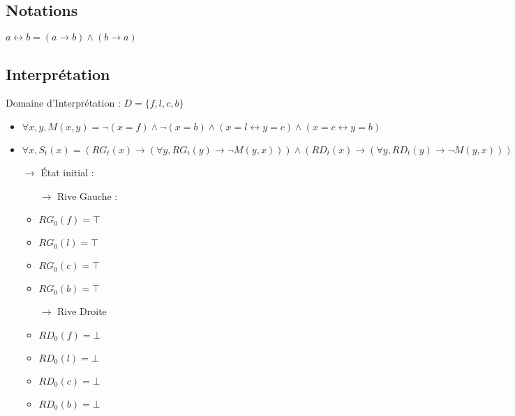 \documentclass{article}
\begin{document}
\subsection{Notations}
$ a \leftrightarrow b = (a \rightarrow b) \wedge  (b \rightarrow a)$
\subsection{Interprétation}
Domaine d'Interprétation : $D = \{f,l,c,b\}$
\begin{itemize}
  \item $\forall x,y , M(x,y) = \neg(x=f) \wedge \neg(x=b) \wedge (x=l \leftrightarrow y=c) \wedge (x=c \leftrightarrow y=b)$
  \item $\forall x , S_t(x) = (RG_t(x) \to (\forall y , RG_t(y) \to \neg M(y,x) )) \wedge (RD_t(x) \to (\forall y , RD_t(y) \to \neg M(y,x) )) $
  \item[$ \to $] État initial :
    \begin{itemize}
      \item[$ \to $] Rive Gauche :
      \item $ RG_0(f) = \top $
      \item $ RG_0(l) = \top $
      \item $ RG_0(c) = \top $
      \item $ RG_0(b) = \top $
      \item[$ \to $] Rive Droite
      \item $ RD_0(f) = \bot $
      \item $ RD_0(l) = \bot $
      \item $ RD_0(c) = \bot $
      \item $ RD_0(b) = \bot $
    \end{itemize}

\end{itemize}
\end{document}
